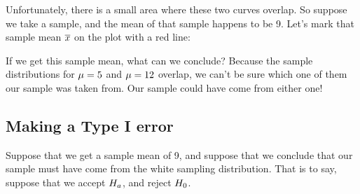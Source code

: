 \documentclass[../../../main.tex]{subfiles}
\begin{document}
\noindent
Unfortunately, there is a small area where these two curves overlap. So suppose we take a sample, and the mean of that sample happens to be 9. Let's mark that sample mean $\overline{x}$ on the plot with a red line:

\begin{center}
\end{center}

\noindent
If we get this sample mean, what can we conclude? Because the sample distributions for $\mu = 5$ and $\mu = 12$ overlap, we can't be sure which one of them our sample was taken from. Our sample could have come from either one!


\subsection{Making a Type I error}

Suppose that we get a sample mean of 9, and suppose that we conclude that our sample must have come from the white sampling distribution. That is to say, suppose that we accept $\AltHyp/$, and reject $\NullHyp/$.
\end{document}

